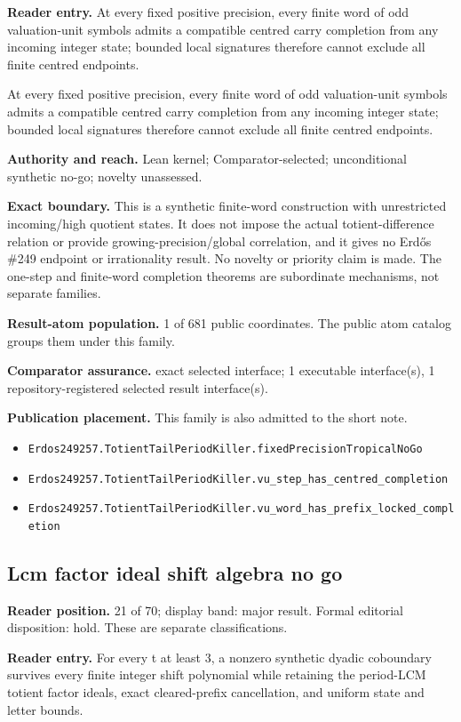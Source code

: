 \textbf{Reader entry.} At every fixed positive precision, every finite word of odd valuation-unit symbols admits a compatible centred carry completion from any incoming integer state; bounded local signatures therefore cannot exclude all finite centred endpoints.

At every fixed positive precision, every finite word of odd valuation-unit symbols admits a compatible centred carry completion from any incoming integer state; bounded local signatures therefore cannot exclude all finite centred endpoints.

\textbf{Authority and reach.} Lean kernel; Comparator-selected; unconditional synthetic no-go; novelty unassessed.

\textbf{Exact boundary.} This is a synthetic finite-word construction with unrestricted incoming/high quotient states. It does not impose the actual totient-difference relation or provide growing-precision/global correlation, and it gives no Erdős \#249 endpoint or irrationality result. No novelty or priority claim is made. The one-step and finite-word completion theorems are subordinate mechanisms, not separate families.

\textbf{Result-atom population.} 1 of 681 public coordinates. The public atom catalog groups them under this family.

\textbf{Comparator assurance.} exact selected interface; 1 executable interface(s), 1 repository-registered selected result interface(s).

\textbf{Publication placement.} This family is also admitted to the short note.

\begin{itemize}
  \item \nolinkurl{Erdos249257.TotientTailPeriodKiller.fixedPrecisionTropicalNoGo}
  \item \nolinkurl{Erdos249257.TotientTailPeriodKiller.vu_step_has_centred_completion}
  \item \nolinkurl{Erdos249257.TotientTailPeriodKiller.vu_word_has_prefix_locked_completion}
\end{itemize}

\subsection{Lcm factor ideal shift algebra no go}
\textbf{Reader position.} 21 of 70; display band: major result.  Formal editorial disposition: hold.  These are separate classifications.

\textbf{Reader entry.} For every t at least 3, a nonzero synthetic dyadic coboundary survives every finite integer shift polynomial while retaining the period-LCM totient factor ideals, exact cleared-prefix cancellation, and uniform state and letter bounds.

